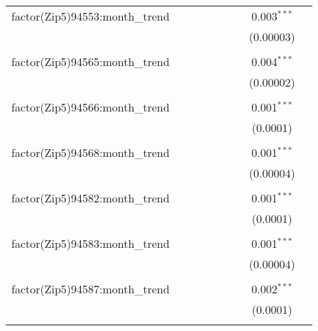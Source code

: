 \begin{table}[H]
{\begin{tabular}{@{\extracolsep{5pt}}lcccccccc}
  factor(Zip5)94553:month\_trend &  &  &  &  &  &  & 0.003$^{***}$ &  \\  

   &  &  &  &  &  &  & (0.00003) &  \\  

   & & & & & & & & \\  

  factor(Zip5)94565:month\_trend &  &  &  &  &  &  & 0.004$^{***}$ &  \\  

   &  &  &  &  &  &  & (0.00002) &  \\  

   & & & & & & & & \\  

  factor(Zip5)94566:month\_trend &  &  &  &  &  &  & 0.001$^{***}$ &  \\  

   &  &  &  &  &  &  & (0.0001) &  \\  

   & & & & & & & & \\  

  factor(Zip5)94568:month\_trend &  &  &  &  &  &  & 0.001$^{***}$ &  \\  

   &  &  &  &  &  &  & (0.00004) &  \\  

   & & & & & & & & \\  

  factor(Zip5)94582:month\_trend &  &  &  &  &  &  & 0.001$^{***}$ &  \\  

   &  &  &  &  &  &  & (0.0001) &  \\  

   & & & & & & & & \\  

  factor(Zip5)94583:month\_trend &  &  &  &  &  &  & 0.001$^{***}$ &  \\  

   &  &  &  &  &  &  & (0.00004) &  \\  

   & & & & & & & & \\  

  factor(Zip5)94587:month\_trend &  &  &  &  &  &  & 0.002$^{***}$ &  \\  

   &  &  &  &  &  &  & (0.0001) &  \\  

   & & & & & & & & \\  


\end{tabular}}
\end{table}
